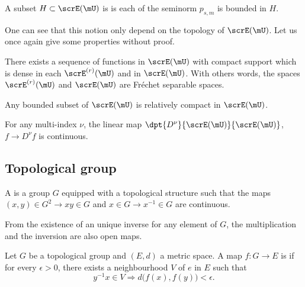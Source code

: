 \begin{definition}
	A subset $H\subset\scrE(\mU)$ is  is each of the seminorm $p_{s,m}$ is bounded in $H$.
	\label{def:bounded}
\end{definition}
One can see that this notion only depend on the topology of $\scrE(\mU)$. Let us once again give some properties without proof.

\begin{proposition}
	There exists a sequence of functions in $\scrE(\mU)$ with compact support which is dense in each $\scrE^{(r)}(\mU)$ and in $\scrE(\mU)$. With others words, the spaces $\scrE^{(r)}(\mU)$ and $\scrE(\mU)$ are Fréchet separable spaces.
	\label{prop:E_Frechet}
\end{proposition}

\begin{proposition}
	Any bounded subset of $\scrE(\mU)$ is relatively compact in $\scrE(\mU)$.
\end{proposition}

\begin{proposition}
	For any multi-index $\nu$, the linear map $\dpt{D^{\nu}}{\scrE(\mU)}{\scrE(\mU)}$, $f\to D^{\nu}f$ is continuous.
\end{proposition}

\subsection{Topological group}


\begin{definition}      \label{DEFooCHZVooHnvSgW}
	A  is a group $G$ equipped with a topological structure such that the maps $(x,y)\in G^2\to xy\in G$ and $x\in G\to x^{-1}\in G$ are continuous.
\end{definition}

\begin{remark}\label{rem:ouvert}
	From the existence of an unique inverse for any element of $G$, the multiplication and the inversion are also open maps.
\end{remark}

\begin{definition}      \label{DEFooUEBTooDqipcL}
	Let \( G\) be a topological group and \( (E,d)\) a metric space. A map \( f\colon G\to E\) is  if for every \( \epsilon>0\), there exists a neighbourhood \( V\) of \( e\) in \( E\) such that
	\begin{equation}
		y^{-1}x\in V\Rightarrow d\big( f(x),f(y) \big)<\epsilon.
	\end{equation}
\end{definition}

